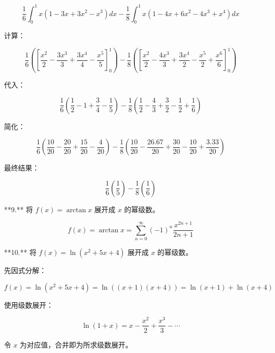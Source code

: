 \[
\frac{1}{6} \int_0^1 x(1-3x+3x^2-x^3) dx - \frac{1}{8} \int_0^1 x(1-4x+6x^2-4x^3+x^4) dx
\]

计算：

\[
\frac{1}{6} \left( \left[ \frac{x^2}{2} - \frac{3x^3}{3} + \frac{3x^4}{4} - \frac{x^5}{5} \right]_0^1 \right) - \frac{1}{8} \left( \left[ \frac{x^2}{2} - \frac{4x^3}{3} + \frac{3x^4}{2} - \frac{x^5}{2} + \frac{x^6}{6} \right]_0^1 \right)
\]

代入：

\[
\frac{1}{6} \left( \frac{1}{2} - 

1 + \frac{3}{4} - \frac{1}{5} \right) - \frac{1}{8} \left( \frac{1}{2} - \frac{4}{3} + \frac{3}{2} - \frac{1}{2} + \frac{1}{6} \right)
\]

简化：

\[
\frac{1}{6} \left( \frac{10}{20} - \frac{20}{20} + \frac{15}{20} - \frac{4}{20} \right) - \frac{1}{8} \left( \frac{10}{20} - \frac{26.67}{20} + \frac{30}{20} - \frac{10}{20} + \frac{3.33}{20} \right)
\]

最终结果：

\[
\frac{1}{6} \left( \frac{1}{5} \right) - \frac{1}{8} \left( \frac{1}{6} \right)
\]

**9.** 将 \( f(x) = \arctan x \) 展开成 \(x\) 的幂级数。

\[
f(x) = \arctan x = \sum_{n=0}^{\infty} (-1)^n \frac{x^{2n+1}}{2n+1}
\]

**10.** 将 \( f(x) = \ln (x^2 + 5x + 4) \) 展开成 \(x\) 的幂级数。

先因式分解：

\[
f(x) = \ln (x^2 + 5x + 4) = \ln ((x+1)(x+4)) = \ln (x+1) + \ln (x+4)
\]

使用级数展开：

\[
\ln (1+x) = x - \frac{x^2}{2} + \frac{x^3}{3} - \cdots
\]

令 \(x\) 为对应值，合并即为所求级数展开。